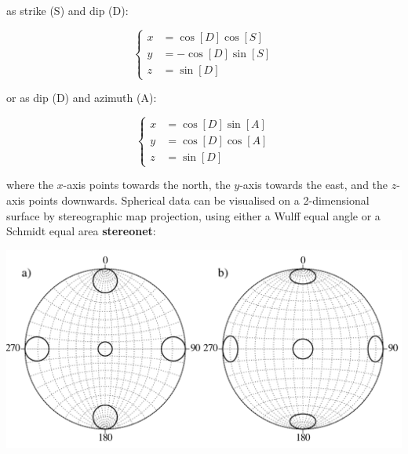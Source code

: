 \noindent as strike (S) and dip (D):

\begin{equation}
  \left\{
  \begin{split}
    x & = \cos[D]\cos[S]\\
    y & = -\cos[D]\sin[S]\\
    z & = \sin[D]
  \end{split}
  \right.
\end{equation}

\noindent or as dip (D) and azimuth (A):

\begin{equation}
  \left\{
  \begin{split}
    x & = \cos[D] \sin[A]\\
    y & = \cos[D] \cos[A]\\
    z & = \sin[D]
  \end{split}
  \right.
\end{equation}

\noindent where the $x$-axis points towards the north, the $y$-axis
towards the east, and the $z$-axis points downwards.  Spherical data
can be visualised on a 2-dimensional surface by stereographic map
projection, using either a Wulff equal angle or a Schmidt equal area
\textbf{stereonet}:

\noindent\begin{minipage}[t][][b]{.6\textwidth}
\includegraphics[width=\textwidth]{../figures/wulffschmidt.pdf}\\
\end{minipage}
\begin{minipage}[t][][t]{.4\textwidth}
  \label{fig:wulfschmidt}
\end{minipage}

